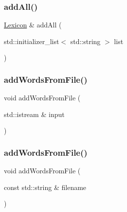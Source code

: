 \mbox{\label{classLexicon_a554e59039648403990042d16710855e0}} 
\subsubsection{\texorpdfstring{add\+All()}{addAll()}\hspace{0.1cm}{\footnotesize\ttfamily [2/2]}}
{\footnotesize\ttfamily \mbox{\hyperlink{classLexicon}{Lexicon}} \& add\+All (\begin{DoxyParamCaption}\item[{std\+::initializer\+\_\+list$<$ std\+::string $>$}]{list }\end{DoxyParamCaption})}

\mbox{\label{classLexicon_a215fcead487aace2e89b04863e326ba6}} 
\subsubsection{\texorpdfstring{add\+Words\+From\+File()}{addWordsFromFile()}\hspace{0.1cm}{\footnotesize\ttfamily [1/2]}}
{\footnotesize\ttfamily void add\+Words\+From\+File (\begin{DoxyParamCaption}\item[{std\+::istream \&}]{input }\end{DoxyParamCaption})}

\mbox{\label{classLexicon_a3891deaa85aee9a52b6ca258d1514716}} 
\subsubsection{\texorpdfstring{add\+Words\+From\+File()}{addWordsFromFile()}\hspace{0.1cm}{\footnotesize\ttfamily [2/2]}}
{\footnotesize\ttfamily void add\+Words\+From\+File (\begin{DoxyParamCaption}\item[{const std\+::string \&}]{filename }\end{DoxyParamCaption})}


